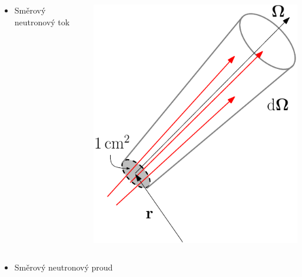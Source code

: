 \begin{frame}
  \begin{columns}[c]
  \begin{column}{.60\linewidth}
  \begin{itemize}
	  \item Směrový neutronový tok
  \end{itemize}
  \end{column}
  \begin{column}{.30\linewidth}
  	\includegraphics[scale=.45]{obr/angflux}
	\end{column}
	\end{columns}
	\vspace{-2em}
	\begin{columns}
	\begin{column}{.60\linewidth}
	\begin{itemize}
	  \item Směrový neutronový proud
\end{itemize}
\end{column}
\end{columns}
\end{frame}
